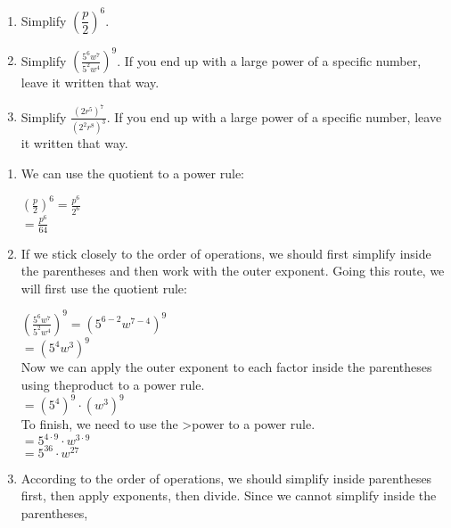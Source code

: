 \documentclass{ximera}
\begin{document}
\begin{example}
\begin{enumerate}
\item Simplify $\left(\dfrac{p}{2}\right)^6$.
        \item  Simplify $\left(\frac{5^6w^7}{5^2w^4}\right)^9$.
                  If you end up with a large power of a specific number,
                  leave it written that way.
\item     Simplify $\frac{\left(2r^5\right)^7}{\left(2^2 r^8\right)^3}$.
                  If you end up with a large power of a specific number,
                  leave it written that way.
\end{enumerate}
\begin{explanation}
\begin{enumerate}
\item    We can use the quotient to a power rule:
\begin{center}
                    $\left(\frac{p}{2}\right)^6=\frac{p^6}{2^6}$\\
                    $=\frac{p^6}{64}$
\end{center}
        \item If we stick closely to the order of operations,
                  we should first simplify inside the parentheses and then work with the outer exponent.
                  Going this route,
                  we will first use the quotient rule:
\begin{center}
                   $\left(\frac{5^6w^7}{5^2w^4}\right)^9 = \left(5^{6-2}w^{7-4}\right)^9$\\
                    $=  \left(5^{4}w^{3}\right)^9$\\
                    Now we can apply the outer exponent to each factor inside the parentheses using theproduct to a power rule. \\
                    $= \left(5^{4}\right)^9\cdot \left(w^{3}\right)^9$ \\
                    To finish, we need to use the >power to a power rule.\\
                    $= 5^{4\cdot 9}\cdot w^{3 \cdot 9}$\\
                    $= 5^{36}\cdot w^{27}$
\end{center}
       \item According to the order of operations,
                  we should simplify inside parentheses first,
                  then apply exponents, then divide.
                  Since we cannot simplify inside the parentheses,

\end{enumerate}
\end{explanation}
\end{example}
\end{document}

